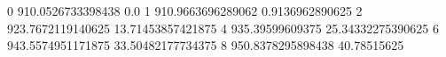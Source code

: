 0 910.0526733398438 0.0
1 910.9663696289062 0.9136962890625
2 923.7672119140625 13.71453857421875
4 935.39599609375 25.34332275390625
6 943.5574951171875 33.50482177734375
8 950.8378295898438 40.78515625
